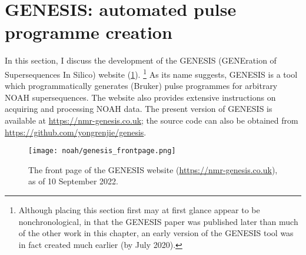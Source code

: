 \section{GENESIS: automated pulse programme creation}
\label{sec:noah__genesis}

In this section, I discuss the development of the GENESIS (GENEration of Supersequences In Silico) website (\cref{fig:genesis_frontpage}).%
\footnote{Although placing this section first may at first glance appear to be nonchronological, in that the GENESIS paper\autocite{Yong2022AC} was published later than much of the other work in this chapter, an early version of the GENESIS tool was in fact created much earlier (by July 2020).}
As its name suggests, GENESIS is a tool which programmatically generates (Bruker) pulse programmes for arbitrary NOAH supersequences.
The website also provides extensive instructions on acquiring and processing NOAH data.
The present version of GENESIS is available at \url{https://nmr-genesis.co.uk}; the source code can also be obtained from \url{https://github.com/yongrenjie/genesis}.

\begin{figure}[!ht]
    \centering
    \texttt{[image: noah/genesis\_frontpage.png]}%
    \caption[Front page of the GENESIS website]{
        The front page of the GENESIS website (\url{https://nmr-genesis.co.uk}), as of 10 September 2022.
    }
    \label{fig:genesis_frontpage}
\end{figure}





